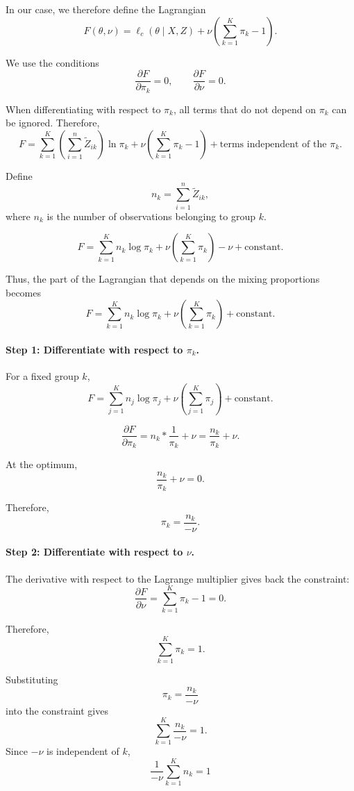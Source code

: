 In our case, we therefore define the Lagrangian
\[
F(\theta,\nu) = \ell_c(\theta \mid X, Z) + \nu \left(\sum_{k=1}^K\pi_k -1 \right).
\]

We use the conditions
\[
\frac{\partial F}{\partial \pi_k}=0,
\qquad
\frac{\partial F}{\partial\nu}=0.
\]

When differentiating with respect to $\pi_k$, all terms that do not
depend on $\pi_k$ can be ignored. Therefore,
\[
F = \sum_{k=1}^K \left(\sum_{i=1}^n\tilde{Z}_{ik} \right)\ln \pi_k + \nu \left(\sum_{k=1}^K\pi_k -1 \right) + \text{terms independent of the }\pi_k.
\]

Define
\[
n_k = \sum_{i=1}^n\tilde{Z}_{ik},
\]
where $n_k$ is the number of observations belonging to group $k$.

\[
F = \sum_{k=1}^K n_k \log \pi_k + \nu \left(\sum_{k=1}^K\pi_k \right) -\nu + \text{constant}.
\]

Thus, the part of the Lagrangian that depends on the mixing
proportions becomes
\[
F = \sum_{k=1}^K n_k \log \pi_k + \nu \left(\sum_{k=1}^K\pi_k \right) + \text{constant}.
\]

\paragraph{Step 1: Differentiate with respect to $\pi_k$.}

For a fixed group $k$,
\[
F = \sum_{j=1}^K n_j \log \pi_j + \nu \left(\sum_{j=1}^K\pi_j \right) + \text{constant}.
\]

\[
\frac{\partial F}{\partial \pi_k} = n_k * \frac{1}{\pi_k} + \nu = \frac{n_k}{\pi_k} + \nu.
\]

At the optimum,
\[
\frac{n_k}{\pi_k}+\nu=0.
\]

Therefore,
\[
\pi_k=\frac{n_k}{-\nu}.
\]

\paragraph{Step 2: Differentiate with respect to $\nu$.}

The derivative with respect to the Lagrange multiplier gives back the constraint:
\[
\frac{\partial F}{\partial\nu} = \sum_{k=1}^K\pi_k - 1= 0.
\]

Therefore,
\[
\sum_{k=1}^K\pi_k=1.
\]

Substituting
\[
\pi_k=\frac{n_k}{-\nu}
\]
into the constraint gives
\[
\sum_{k=1}^K\frac{n_k}{-\nu}=1.
\]
Since $-\nu$ is independent of $k$,
\[
\frac{1}{-\nu}\sum_{k=1}^{K}n_k = 1
\]

